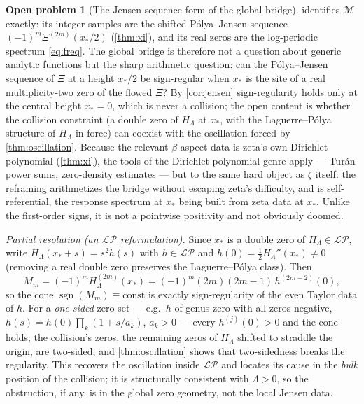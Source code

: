 \documentclass[11pt,reqno]{amsart}
\theoremstyle{plain}
\theoremstyle{definition}
\newtheorem{problem}[theorem]{Open problem}
\theoremstyle{remark}
\newcommand{\Mcal}{\mathcal M}
\DeclareMathOperator{\sgn}{sgn}
\begin{document}
\begin{problem}[The Jensen-sequence form of the global bridge]
 identifies $\Mcal$ exactly: its integer samples are
the shifted P\'olya--Jensen sequence $(-1)^m\Xi^{(2m)}(x_*/2)$
(\cref{thm:xi}), and its real zeros are the log-periodic spectrum
\eqref{eq:freq}. The global bridge is therefore not a question about generic
analytic functions but the sharp arithmetic question: can the
P\'olya--Jensen sequence of $\Xi$ at a height $x_*/2$ be sign-regular when
$x_*$ is the site of a real multiplicity-two zero of the flowed $\Xi$? By
\cref{cor:jensen} sign-regularity holds only at the central height $x_*=0$,
which is never a collision; the open content is whether the collision
constraint (a double zero of $H_\Lambda$ at $x_*$, with the
Laguerre--P\'olya structure of $H_\Lambda$ in force) can coexist with the
oscillation forced by \cref{thm:oscillation}. Because the relevant
$\beta$-aspect data is zeta's own Dirichlet polynomial (\cref{thm:xi}), the
tools of the Dirichlet-polynomial genre apply --- Tur\'an power sums,
zero-density estimates --- but to the same hard object as $\zeta$ itself: the
reframing arithmetizes the bridge without escaping zeta's difficulty, and is
self-referential, the response spectrum at $x_*$ being built from zeta data
at $x_*$. Unlike the first-order signs, it is not a pointwise positivity and
not obviously doomed.

\smallskip\noindent\emph{Partial resolution (an $\mathcal{LP}$ reformulation).}
Since $x_*$ is a double zero of $H_\Lambda\in\mathcal{LP}$, write
$H_\Lambda(x_*+s)=s^2h(s)$ with $h\in\mathcal{LP}$ and
$h(0)=\tfrac12H_\Lambda''(x_*)\neq0$ (removing a real double zero preserves
the Laguerre--P\'olya class). Then
\begin{equation}\label{eq:LPform}
  M_m=(-1)^m H_\Lambda^{(2m)}(x_*)=(-1)^m(2m)(2m-1)\,h^{(2m-2)}(0),
\end{equation}
so the cone $\sgn(M_m)\equiv\text{const}$ is exactly sign-regularity of the
even Taylor data of $h$. For a \emph{one-sided} zero set --- e.g.\ $h$ of
genus zero with all zeros negative, $h(s)=h(0)\prod_k(1+s/a_k)$, $a_k>0$ ---
every $h^{(j)}(0)>0$ and the cone holds; the collision's zeros, the remaining
zeros of $H_\Lambda$ shifted to straddle the origin, are two-sided, and
\cref{thm:oscillation} shows that two-sidedness breaks the regularity. This
recovers the oscillation inside $\mathcal{LP}$ and locates its cause in the
\emph{bulk} position of the collision; it is structurally consistent with
$\Lambda>0$, so the obstruction, if any, is in the global zero geometry, not
the local Jensen data.
\end{problem}
\end{document}
